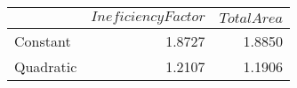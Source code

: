 \begin{tabular}{lrr}
\toprule
{} &  $Ineficiency Factor$ &  $TotalArea$ \\
\midrule
Constant  &                1.8727 &       1.8850 \\
Quadratic &                1.2107 &       1.1906 \\
\bottomrule
\end{tabular}
